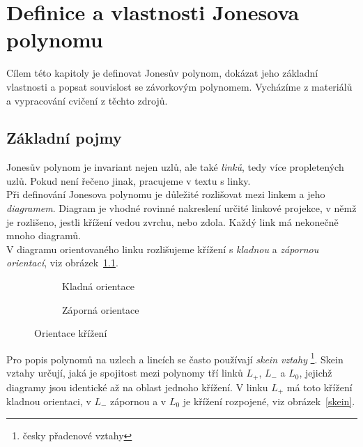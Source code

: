 
\chapter{Definice a vlastnosti Jonesova polynomu}
Cílem této kapitoly je definovat Jonesův polynom, dokázat jeho základní vlastnosti a popsat souvislost se závorkovým polynomem. Vycházíme z materiálů~\cite{cromwell2004knots, Adams2004, jones2005} a vypracování cvičení z těchto zdrojů.
\section{Základní pojmy}
Jonesův polynom je invariant nejen uzlů, ale také \emph{linků}, tedy více propletených uzlů. Pokud není řečeno jinak, pracujeme v textu s linky. \\
Při definování Jonesova polynomu je důležité rozlišovat mezi linkem a jeho \emph{diagramem}. Diagram je vhodné rovinné nakreslení určité linkové projekce, v němž je rozlišeno, jestli křížení vedou zvrchu, nebo zdola. Každý link má nekonečně mnoho diagramů.
\\
V diagramu orientovaného linku rozlišujeme křížení s \emph{kladnou} a \emph{zápornou orientací}, viz obrázek~\ref{orientace}.

\begin{figure}[h]  

\centering 
\begin{subfigure}[t]{0.4\linewidth}\centering
{} 
\caption{Kladná orientace} 
\end{subfigure}
\begin{subfigure}[t]{0.4\linewidth}\centering
{}  
\caption{Záporná orientace}
\end{subfigure}
\caption{Orientace křížení} \label{orientace}
\end{figure}  


Pro popis polynomů na uzlech a lincích se často používají \emph{skein vztahy} \footnote{česky přadenové vztahy}.
Skein vztahy určují, jaká je spojitost mezi polynomy tří linků $L_+$, $ L_-$ a $L_0$, jejichž diagramy jsou identické až na oblast jednoho křížení. V linku $L_+$ má toto křížení kladnou orientaci, v $L_-$ zápornou a v $L_0$ je křížení rozpojené, viz obrázek~\ref{skein}.

